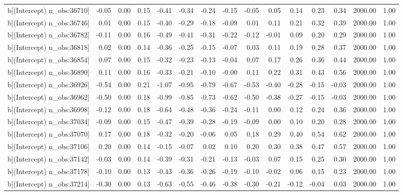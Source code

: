 \begin{table}[ht]
\begin{tabular}{rrrrrrrrrrrrrrr}
  b[(Intercept) n\_obs:36710] & -0.05 & 0.00 & 0.15 & -0.41 & -0.34 & -0.24 & -0.15 & -0.05 & 0.05 & 0.14 & 0.23 & 0.34 & 2000.00 & 1.00 \\ 
  b[(Intercept) n\_obs:36746] & 0.01 & 0.00 & 0.15 & -0.40 & -0.29 & -0.18 & -0.09 & 0.01 & 0.11 & 0.21 & 0.32 & 0.39 & 2000.00 & 1.00 \\ 
  b[(Intercept) n\_obs:36782] & -0.11 & 0.00 & 0.16 & -0.49 & -0.41 & -0.31 & -0.22 & -0.12 & -0.01 & 0.09 & 0.20 & 0.29 & 2000.00 & 1.00 \\ 
  b[(Intercept) n\_obs:36818] & 0.02 & 0.00 & 0.14 & -0.36 & -0.25 & -0.15 & -0.07 & 0.03 & 0.11 & 0.19 & 0.28 & 0.37 & 2000.00 & 1.00 \\ 
  b[(Intercept) n\_obs:36854] & 0.07 & 0.00 & 0.15 & -0.32 & -0.23 & -0.13 & -0.04 & 0.07 & 0.17 & 0.26 & 0.36 & 0.44 & 2000.00 & 1.00 \\ 
  b[(Intercept) n\_obs:36890] & 0.11 & 0.00 & 0.16 & -0.33 & -0.21 & -0.10 & -0.00 & 0.11 & 0.22 & 0.31 & 0.43 & 0.56 & 2000.00 & 1.00 \\ 
  b[(Intercept) n\_obs:36926] & -0.54 & 0.00 & 0.21 & -1.07 & -0.95 & -0.79 & -0.67 & -0.53 & -0.40 & -0.28 & -0.15 & -0.03 & 2000.00 & 1.00 \\ 
  b[(Intercept) n\_obs:36962] & -0.50 & 0.00 & 0.18 & -0.99 & -0.85 & -0.73 & -0.62 & -0.50 & -0.38 & -0.27 & -0.15 & -0.03 & 2000.00 & 1.00 \\ 
  b[(Intercept) n\_obs:36998] & -0.12 & 0.00 & 0.18 & -0.64 & -0.48 & -0.36 & -0.24 & -0.11 & 0.00 & 0.12 & 0.24 & 0.36 & 2000.00 & 1.00 \\ 
  b[(Intercept) n\_obs:37034] & -0.09 & 0.00 & 0.15 & -0.47 & -0.39 & -0.28 & -0.19 & -0.09 & 0.00 & 0.10 & 0.20 & 0.28 & 2000.00 & 1.00 \\ 
  b[(Intercept) n\_obs:37070] & 0.17 & 0.00 & 0.18 & -0.32 & -0.20 & -0.06 & 0.05 & 0.18 & 0.29 & 0.40 & 0.54 & 0.62 & 2000.00 & 1.00 \\ 
  b[(Intercept) n\_obs:37106] & 0.20 & 0.00 & 0.14 & -0.15 & -0.07 & 0.02 & 0.10 & 0.20 & 0.30 & 0.38 & 0.47 & 0.57 & 2000.00 & 1.00 \\ 
  b[(Intercept) n\_obs:37142] & -0.03 & 0.00 & 0.14 & -0.39 & -0.31 & -0.21 & -0.13 & -0.03 & 0.07 & 0.15 & 0.25 & 0.30 & 2000.00 & 1.00 \\ 
  b[(Intercept) n\_obs:37178] & -0.10 & 0.00 & 0.13 & -0.43 & -0.36 & -0.26 & -0.19 & -0.10 & -0.02 & 0.06 & 0.15 & 0.23 & 2000.00 & 1.00 \\ 
  b[(Intercept) n\_obs:37214] & -0.30 & 0.00 & 0.13 & -0.63 & -0.55 & -0.46 & -0.38 & -0.30 & -0.21 & -0.12 & -0.04 & 0.03 & 2000.00 & 1.00 \\ 

\end{tabular}
\end{table}

